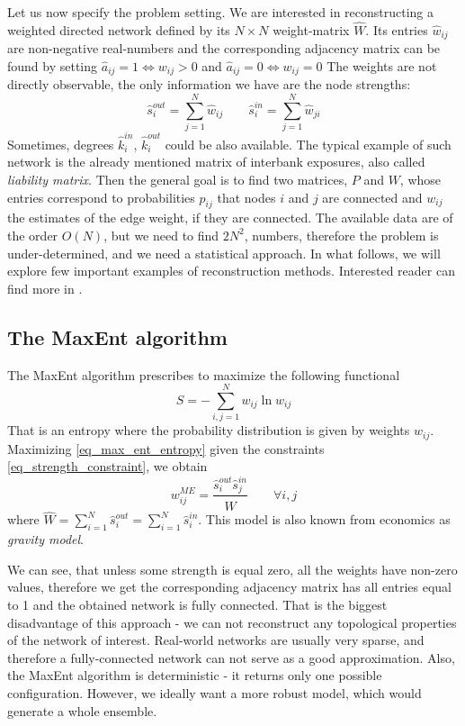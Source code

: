 Let us now specify the problem setting. We are interested in reconstructing a weighted directed network defined by its $N \times N$ weight-matrix $\hat{W}$. Its entries $\hat{w}_{ij}$ are non-negative real-numbers and the corresponding adjacency matrix can be found by setting $\hat{a}_{ij} = 1 \iff w_{ij} > 0$ and $\hat{a}_{ij} = 0 \iff w_{ij} = 0$
The weights are not directly observable, the only information we have are the node strengths: 
\begin{equation}
    \hat{s}_i^{out} = \sum_{j=1}^N \hat{w}_{ij} \qquad \hat{s}_i^{in} = \sum_{j=1}^N \hat{w}_{ji}
    \label{eq_strength_constraint}
\end{equation}
Sometimes, degrees $\hat{k}_i^{in}$, $\hat{k}_i^{out}$ could be also available. The typical example of such network is the already mentioned matrix of interbank exposures, also called \textit{liability matrix}. 
Then the general goal is to find two matrices, $P$ and $W$, whose entries correspond to probabilities $p_{ij}$ that nodes $i$ and $j$ are connected and $w_{ij}$ the estimates of the edge weight, if they are connected. The available data are of the order $O(N)$, but we need to find $2N^2$, numbers, therefore the problem is under-determined, and we need a statistical approach. In what follows, we will explore few important examples of reconstruction methods. Interested reader can find more in \cite{Squartini2018}.

\subsection{The MaxEnt algorithm}
The MaxEnt algorithm prescribes to maximize the following functional
\begin{equation}
    S = -\sum_{i,j=1}^N w_{ij}\ln w_{ij}
    \label{eq_max_ent_entropy}
\end{equation}
That is an entropy where the probability distribution is given by weights $w_{ij}$. Maximizing \ref{eq_max_ent_entropy} given the constraints \ref{eq_strength_constraint}, we obtain
\begin{equation}
    w_{ij}^{ME} = \frac{\hat{s}_i^{out}\hat{s}_j^{in}}{\hat{W}} \qquad \forall i, j
\end{equation}
where $\hat{W} = \sum_{i=1}^N \hat{s}_i^{out} = \sum_{i=1}^N \hat{s}_i^{in}$. This model is also known from economics as \textit{gravity model}.

We can see, that unless some strength is equal zero, all the weights have non-zero values, therefore we get the corresponding adjacency matrix has all entries equal to 1 and the obtained network is fully connected. That is the biggest disadvantage of this approach - we can not reconstruct any topological properties of the network of interest. Real-world networks are usually very sparse, and therefore a fully-connected network can not serve as a good approximation. Also, the MaxEnt algorithm is deterministic - it returns only one possible configuration. However, we ideally want a more robust model, which would generate a whole ensemble.

